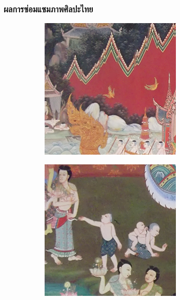 \documentclass[xcolor=dvipsnames, xetex,serif]{beamer}
\numberwithin{equation}{section}
\begin{document}
    \begin{frame}
        \frametitle{ผลการซ่อมแซมภาพศิลปะไทย}
        \begin{figure}[H]
            \centering
            \begin{subfigure}{0.15\linewidth}
                \centering
                \includegraphics[width=0.9\linewidth]{images/result_ex4/splitbergman_case01.png}
            \end{subfigure}
            \begin{subfigure}{0.15\linewidth}
                \centering
                \includegraphics[width=0.9\linewidth]{images/result_ex4/splitbergman_case02.png}

\end{subfigure}
\end{figure}
\end{frame}
\end{document}
